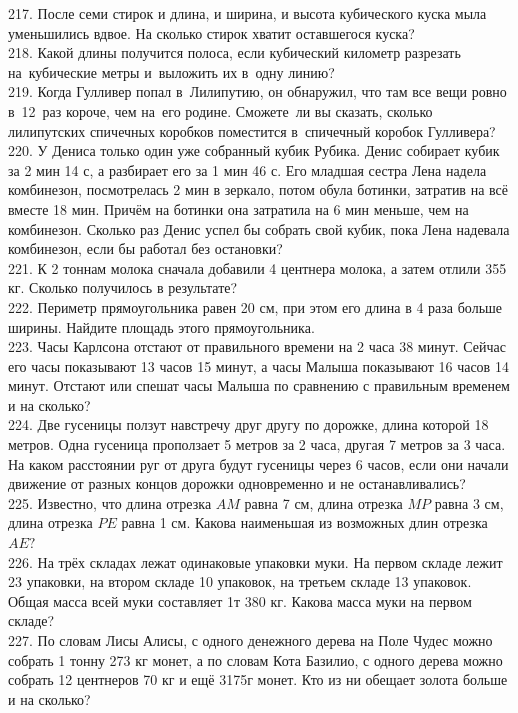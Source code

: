 \documentclass[12pt]{article}
\begin{document}
217. После семи стирок и длина, и ширина, и высота кубического куска мыла уменьшились вдвое. На сколько стирок хватит оставшегося куска?\\
218. Какой длины получится полоса, если кубический километр разрезать на кубические метры и выложить их в одну линию?\\
219. Когда Гулливер попал в Лилипутию, он обнаружил, что там все вещи ровно в 12 раз короче, чем на его родине. Сможете ли вы сказать, сколько лилипутских спичечных коробков поместится в спичечный коробок Гулливера?\\
220. У Дениса только один уже собранный кубик Рубика. Денис собирает кубик за 2 мин 14 с, а разбирает его за 1 мин 46 с. Его младшая сестра Лена надела комбинезон, посмотрелась 2 мин в зеркало, потом обула ботинки, затратив на всё вместе 18 мин. Причём на ботинки она затратила на 6 мин меньше, чем на комбинезон. Сколько раз Денис успел бы собрать свой кубик, пока Лена надевала комбинезон, если бы работал без остановки?\\
221. К 2 тоннам молока сначала добавили 4 центнера молока, а затем отлили 355 кг. Сколько получилось в результате?\\
222. Периметр прямоугольника равен 20 см, при этом его длина в 4 раза больше ширины. Найдите площадь этого прямоугольника.\\
223. Часы Карлсона отстают от правильного времени на 2 часа 38 минут. Сейчас его часы показывают 13 часов 15 минут, а часы Малыша показывают 16 часов 14 минут. Отстают или спешат часы Малыша по сравнению с правильным временем и на сколько?\\
224. Две гусеницы ползут навстречу друг другу по дорожке, длина которой 18 метров. Одна гусеница проползает 5 метров за 2 часа, другая 7 метров за 3 часа. На каком расстоянии руг от друга будут гусеницы через 6 часов, если они начали движение от разных концов дорожки одновременно и не останавливались?\\
225. Известно, что длина отрезка $AM$ равна 7 см, длина отрезка $MP$ равна 3 см, длина отрезка $PE$ равна 1 см. Какова наименьшая из возможных длин отрезка $AE?$\\
226. На трёх складах лежат одинаковые упаковки муки. На первом складе лежит 23 упаковки, на втором складе 10 упаковок, на третьем складе 13 упаковок. Общая масса всей муки составляет 1т 380 кг. Какова масса муки на первом складе?\\
227. По словам Лисы Алисы, с одного денежного дерева на Поле Чудес можно собрать 1 тонну 273 кг монет, а по словам Кота Базилио, с одного дерева можно собрать 12 центнеров 70 кг и ещё 3175г монет. Кто из ни обещает золота больше и на сколько?\\
\end{document}
